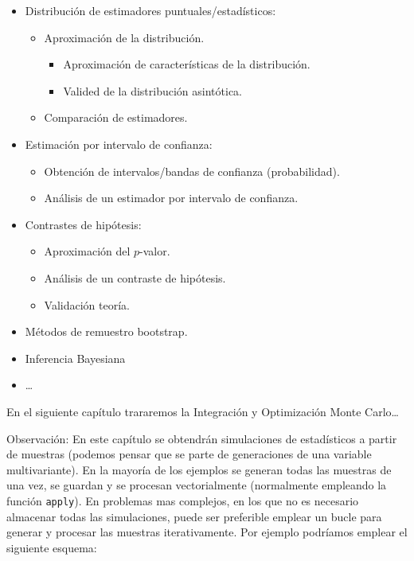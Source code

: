 \documentclass[]{book}
\theoremstyle{definition}
\theoremstyle{definition}
\theoremstyle{definition}
\theoremstyle{remark}
\begin{document}
\begin{itemize}
\item
  Distribución de estimadores puntuales/estadísticos:

  \begin{itemize}
  \item
    Aproximación de la distribución.

    \begin{itemize}
    \item
      Aproximación de características de la distribución.
    \item
      Valided de la distribución asintótica.
    \end{itemize}
  \item
    Comparación de estimadores.
  \end{itemize}
\item
  Estimación por intervalo de confianza:

  \begin{itemize}
  \item
    Obtención de intervalos/bandas de confianza (probabilidad).
  \item
    Análisis de un estimador por intervalo de confianza.
  \end{itemize}
\item
  Contrastes de hipótesis:

  \begin{itemize}
  \item
    Aproximación del \(p\)-valor.
  \item
    Análisis de un contraste de hipótesis.
  \item
    Validación teoría.
  \end{itemize}
\item
  Métodos de remuestro bootstrap.
\item
  Inferencia Bayesiana
\item
  \ldots{}
\end{itemize}

En el siguiente capítulo trararemos la Integración y Optimización Monte
Carlo\ldots{}

Observación: En este capítulo se obtendrán simulaciones de estadísticos
a partir de muestras (podemos pensar que se parte de generaciones de una
variable multivariante). En la mayoría de los ejemplos se generan todas
las muestras de una vez, se guardan y se procesan vectorialmente
(normalmente empleando la función \texttt{apply}). En problemas mas
complejos, en los que no es necesario almacenar todas las simulaciones,
puede ser preferible emplear un bucle para generar y procesar las
muestras iterativamente. Por ejemplo podríamos emplear el siguiente
esquema:
\end{document}
